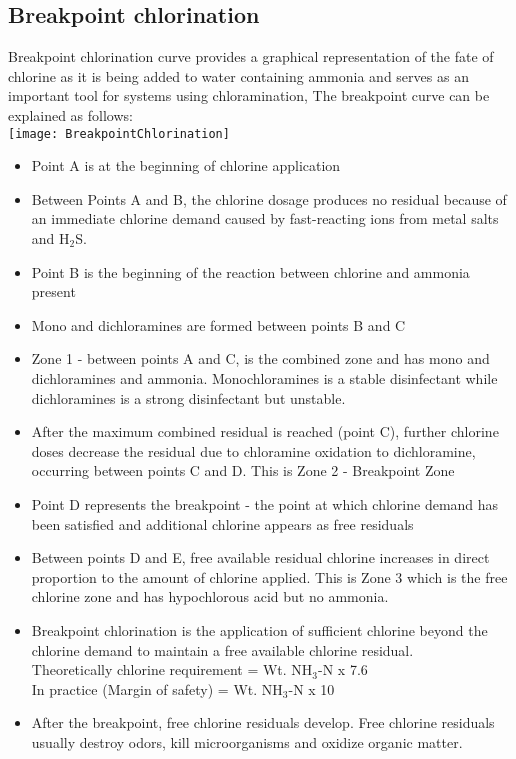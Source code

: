 	\subsection{Breakpoint chlorination}		
			Breakpoint chlorination curve provides a graphical representation of the fate of chlorine as it is being added to water containing ammonia and serves as an important tool for systems using chloramination, 
The breakpoint curve can be explained as follows:\\
			\texttt{[image: BreakpointChlorination]}
			\begin{itemize}
				\item Point A is at the beginning of chlorine application
				\item Between Points A and B, the chlorine dosage produces no residual because of an immediate chlorine demand caused by fast-reacting ions from metal salts and H$_2$S.
				\item Point B is the beginning of the reaction between chlorine and ammonia present
				\item Mono and dichloramines are formed between points B and C
				\item Zone 1 - between points A and C, is the combined zone and has mono and dichloramines and ammonia.  Monochloramines is a stable disinfectant while dichloramines is a strong disinfectant but unstable.
				\item After the maximum combined residual is reached (point C), further chlorine doses decrease the residual due to chloramine oxidation to dichloramine, occurring between points C and D.  This is Zone 2 - Breakpoint Zone
				\item Point D represents the breakpoint - the point at which chlorine demand has been satisfied and additional chlorine appears as free residuals
				\item Between points D and E, free available residual chlorine increases in direct proportion to the amount of chlorine applied.  This is Zone 3 which is the free chlorine zone and has hypochlorous acid but no ammonia.
								\item Breakpoint chlorination is the application of sufficient chlorine beyond the chlorine demand to maintain a free available chlorine residual.\\  Theoretically chlorine requirement = Wt. NH$_3$-N x 7.6\\
								In practice (Margin of safety)     = Wt. NH$_3$-N x 10\\
				\item After the breakpoint, free chlorine residuals develop. Free chlorine residuals usually destroy odors, kill microorganisms and oxidize organic matter.

			\end{itemize}
